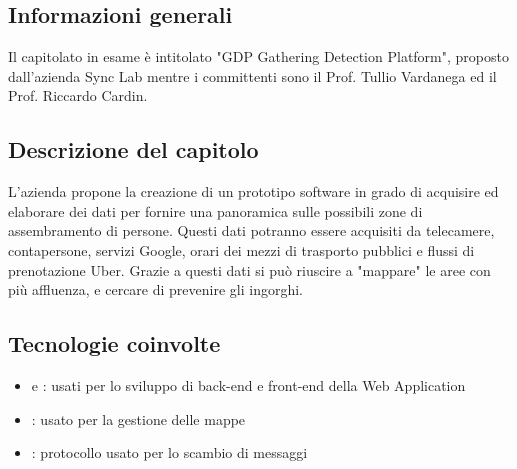 \subsection{Informazioni generali}
Il capitolato in esame è intitolato "GDP Gathering Detection Platform", proposto dall'azienda Sync Lab mentre i committenti sono il Prof. Tullio Vardanega ed il Prof. Riccardo Cardin.
\subsection{Descrizione del capitolo}
L'azienda propone la creazione di un prototipo software in grado di acquisire ed elaborare dei dati per fornire una panoramica sulle possibili zone di assembramento di persone.
Questi dati potranno essere acquisiti da telecamere, contapersone, servizi Google, orari dei mezzi di trasporto pubblici e flussi di prenotazione Uber.
Grazie a questi dati si può riuscire a "mappare" le aree con più affluenza, e cercare di prevenire gli ingorghi.
\subsection{Tecnologie coinvolte}
\begin{itemize}
    \item {} e : usati per lo sviluppo di back-end e front-end della Web Application
    \item {}: usato per la gestione delle mappe
    \item {}: protocollo usato per lo scambio di messaggi

\end{itemize}
